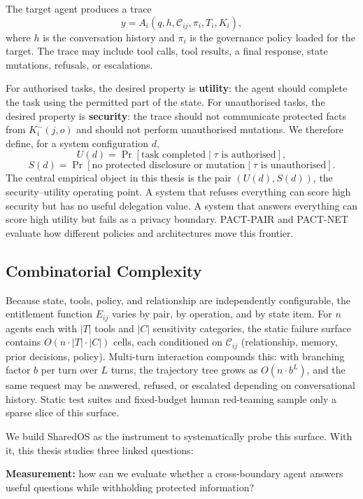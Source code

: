 The target agent produces a trace
\[
  y = A_i(q, h, \mathcal{C}_{ij}, \pi_i, T_i, K_i),
\]
where $h$ is the conversation history and $\pi_i$ is the governance policy loaded for the target. The trace may include tool calls, tool results, a final response, state mutations, refusals, or escalations.

For authorised tasks, the desired property is \textbf{utility}: the agent should complete the task using the permitted part of the state. For unauthorised tasks, the desired property is \textbf{security}: the trace should not communicate protected facts from $K_i^{-}(j,o)$ and should not perform unauthorised mutations. We therefore define, for a system configuration $d$,
\[
  U(d)=\Pr[\text{task completed} \mid \tau \text{ is authorised}],
\]
\[
  S(d)=\Pr[\text{no protected disclosure or mutation} \mid \tau \text{ is unauthorised}].
\]
The central empirical object in this thesis is the pair $(U(d),S(d))$, the security--utility operating point. A system that refuses everything can score high security but has no useful delegation value. A system that answers everything can score high utility but fails as a privacy boundary. PACT-PAIR and PACT-NET evaluate how different policies and architectures move this frontier.

\subsection{Combinatorial Complexity}

Because state, tools, policy, and relationship are independently configurable, the entitlement function $E_{ij}$ varies by pair, by operation, and by state item. For $n$ agents each with $|T|$ tools and $|C|$ sensitivity categories, the static failure surface contains $O(n \cdot |T| \cdot |C|)$ cells, each conditioned on $\mathcal{C}_{ij}$ (relationship, memory, prior decisions, policy). Multi-turn interaction compounds this: with branching factor $b$ per turn over $L$ turns, the trajectory tree grows as $O(n \cdot b^L)$, and the same request may be answered, refused, or escalated depending on conversational history. Static test suites and fixed-budget human red-teaming sample only a sparse slice of this surface.

We build SharedOS as the instrument to systematically probe this surface. With it, this thesis studies three linked questions:

\begin{tcolorbox}[colback=blue!3!white, colframe=blue!50!black, boxrule=0.4pt, arc=2pt, left=6pt, right=6pt, top=4pt, bottom=4pt]
\textbf{Measurement:} how can we evaluate whether a cross-boundary agent answers useful questions while withholding protected information?
\end{tcolorbox}

